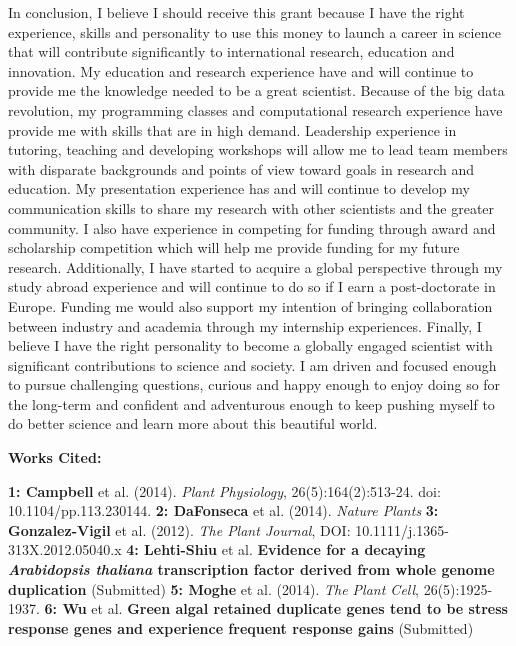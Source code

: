 \documentclass[12pt]{amsart}
\begin{document}
In conclusion, I believe I should receive this grant because I have the right experience, skills and personality to use this money to launch a career in science that will contribute significantly to international research, education and innovation.  
My education and research experience have and will continue to provide me the knowledge needed to be a great scientist.  
Because of the big data revolution, my programming classes and computational research experience have provide me with skills that are in high demand.
Leadership experience in tutoring, teaching and developing workshops will allow me to lead team members with disparate backgrounds and points of view toward goals in research and education.
My presentation experience has and will continue to develop my communication skills to share my research with other scientists and the greater community.
I also have experience in competing for funding through award and scholarship competition which will help me provide funding for my future research.  
Additionally, I have started to acquire a global perspective through my study abroad experience and will continue to do so if I earn a post-doctorate in Europe.  
Funding me would also support my intention of bringing collaboration between industry and academia through my internship experiences.
Finally, I believe I have the right personality to become a globally engaged scientist with significant contributions to science and society.  
I am driven and focused enough to pursue challenging questions, curious and happy enough to enjoy doing so for the long-term and confident and adventurous enough to keep pushing myself to do better science and learn more about this beautiful world.

\small{
\hfill\break\textbf{Works Cited: }\hfill

\textbf{1: Campbell} et al. (2014). \textit{Plant Physiology}, 26(5):164(2):513-24. doi: 10.1104/pp.113.230144.
\textbf{2: DaFonseca} et al. (2014). \textit{Nature Plants}
\textbf{3: Gonzalez-Vigil} et al. (2012). \textit{The Plant Journal}, DOI: 10.1111/j.1365-313X.2012.05040.x 
\textbf{4: Lehti-Shiu} et al. \textbf{Evidence for a decaying \textit{Arabidopsis thaliana} transcription factor derived from whole genome duplication} (Submitted)
\textbf{5: Moghe} et al. (2014). \textit{The Plant Cell}, 26(5):1925-1937.
\textbf{6: Wu} et al. \textbf{Green algal retained duplicate genes tend to be stress response genes and experience frequent response gains} (Submitted)
}
\end{document}
